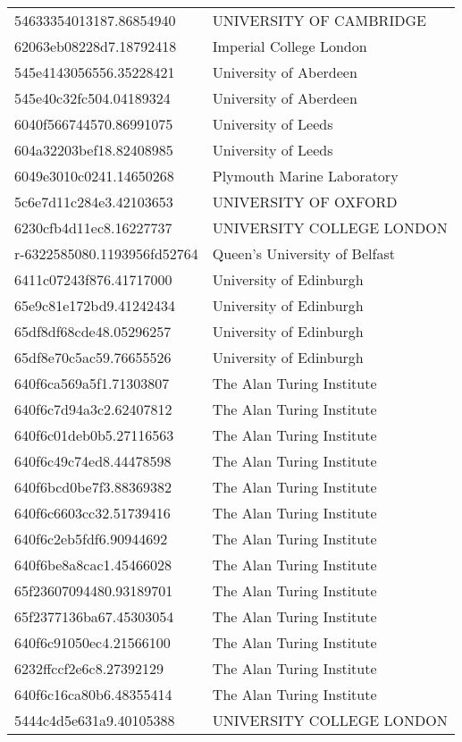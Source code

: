 \begin{tabular}{ll}
54633354013187.86854940 & UNIVERSITY OF CAMBRIDGE \\
62063eb08228d7.18792418 & Imperial College London \\
545e4143056556.35228421 & University of Aberdeen \\
545e40c32fc504.04189324 & University of Aberdeen \\
6040f566744570.86991075 & University of Leeds \\
604a32203bef18.82408985 & University of Leeds \\
6049e3010c0241.14650268 & Plymouth Marine Laboratory \\
5c6e7d11c284e3.42103653 & UNIVERSITY OF OXFORD \\
6230cfb4d11ec8.16227737 & UNIVERSITY COLLEGE LONDON \\
r-6322585080.1193956fd52764 & Queen's University of Belfast \\
6411c07243f876.41717000 & University of Edinburgh \\
65e9c81e172bd9.41242434 & University of Edinburgh \\
65df8df68cde48.05296257 & University of Edinburgh \\
65df8e70c5ac59.76655526 & University of Edinburgh \\
640f6ca569a5f1.71303807 & The Alan Turing Institute \\
640f6c7d94a3c2.62407812 & The Alan Turing Institute \\
640f6c01deb0b5.27116563 & The Alan Turing Institute \\
640f6c49c74ed8.44478598 & The Alan Turing Institute \\
640f6bcd0be7f3.88369382 & The Alan Turing Institute \\
640f6c6603cc32.51739416 & The Alan Turing Institute \\
640f6c2eb5fdf6.90944692 & The Alan Turing Institute \\
640f6be8a8cac1.45466028 & The Alan Turing Institute \\
65f23607094480.93189701 & The Alan Turing Institute \\
65f2377136ba67.45303054 & The Alan Turing Institute \\
640f6c91050ec4.21566100 & The Alan Turing Institute \\
6232ffccf2e6c8.27392129 & The Alan Turing Institute \\
640f6c16ca80b6.48355414 & The Alan Turing Institute \\
5444c4d5e631a9.40105388 & UNIVERSITY COLLEGE LONDON \\

\end{tabular}
